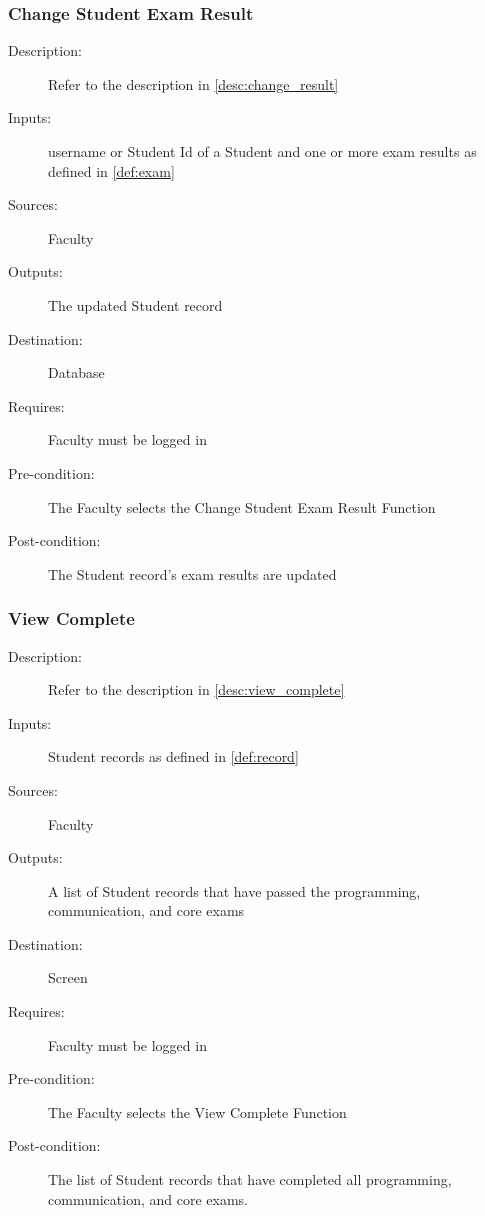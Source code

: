 \subsubsection{\large Change Student Exam Result} 
\begin{boxed} %
\begin{description}
\item[Description:]
   Refer to the description in \autoref{desc:change_result}
\item[Inputs:]
   username or Student Id of a Student and one or more exam results as defined
   in \autoref{def:exam}
\item[Sources:]
   Faculty
\item[Outputs:]
   The updated Student record
\item[Destination:]
   Database
\item[Requires:]
   Faculty must be logged in
\item[Pre-condition:]
   The Faculty selects the Change Student Exam Result Function
\item[Post-condition:]
   The Student record's exam results are updated
\end{description}
\end{boxed} %

\subsubsection{\large View Complete}  
\begin{boxed} %
\begin{description}
\item[Description:]
   Refer to the description in \autoref{desc:view_complete}
\item[Inputs:]
   Student records as defined in \autoref{def:record}
\item[Sources:]
   Faculty
\item[Outputs:]
   A list of Student records that have passed the programming,
   communication, and core exams
\item[Destination:]
   Screen
\item[Requires:]
   Faculty must be logged in
\item[Pre-condition:]
   The Faculty selects the View Complete Function
\item[Post-condition:]
   The list of Student records that have completed all programming,
   communication, and core exams.
\end{description}
\end{boxed}

